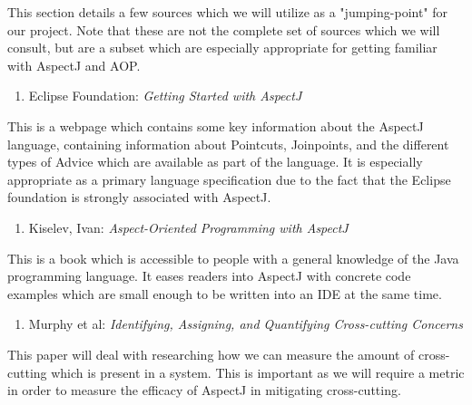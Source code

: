 \documentclass[sigconf]{acmart}
\begin{document}
This section details a few sources which we will utilize as a "jumping-point" for our project. Note that these are not the complete set of sources which we will consult, but are a subset which are especially appropriate for getting familiar with AspectJ and AOP.

\begin{enumerate}
    \item Eclipse Foundation: \textit{Getting Started with AspectJ}
\end{enumerate}
This is a webpage which contains some key information about the AspectJ language, containing information about Pointcuts, Joinpoints, and the different types of Advice which are available as part of the language. It is especially appropriate as a primary language specification due to the fact that the Eclipse foundation is strongly associated with AspectJ.

\begin{enumerate}
    \item Kiselev, Ivan: \textit{Aspect-Oriented Programming with AspectJ}
\end{enumerate}
This is a book which is accessible to people with a general knowledge of the Java programming language. It eases readers into AspectJ with concrete code examples which are small enough to be written into an IDE at the same time.

\begin{enumerate}
    \item Murphy et al: \textit{Identifying, Assigning, and Quantifying Cross-cutting Concerns}
\end{enumerate}
This paper will deal with researching how we can measure the amount of cross-cutting which is present in a system. This is important as we will require a metric in order to measure the efficacy of AspectJ in mitigating cross-cutting.
\end{document}
